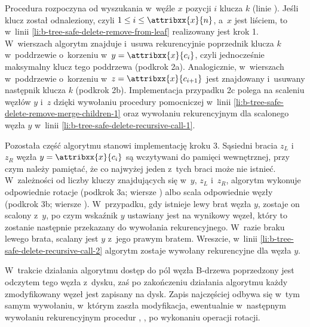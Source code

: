 Procedura rozpoczyna od wyszukania w~węźle $x$ pozycji $i$ klucza $k$ (linie \doubledash{\ref{li:b-tree-safe-delete-search-begin}}{\ref{li:b-tree-safe-delete-search-end}}).
Jeśli klucz został odnaleziony, czyli $1\le i\le\attribxx{x}{n}$, a~$x$ jest liściem, to w~linii \ref{li:b-tree-safe-delete-remove-from-leaf} realizowany jest krok 1.
W~wierszach \doubledash{\ref{li:b-tree-safe-delete-remove-predecessor-begin}}{\ref{li:b-tree-safe-delete-remove-predecessor-end}} algorytm znajduje i~usuwa rekurencyjnie poprzednik klucza $k$ w~poddrzewie o~korzeniu w~$y=\attribxx{x}{c_i}$, czyli jednocześnie maksymalny klucz tego poddrzewa (podkrok 2a).
Analogicznie, w~wierszach \doubledash{\ref{li:b-tree-safe-delete-remove-successor-begin}}{\ref{li:b-tree-safe-delete-remove-successor-end}} w~poddrzewie o~korzeniu w~$z=\attribxx{x}{c_{i+1}}$ jest znajdowany i~usuwany następnik klucza $k$ (podkrok 2b).
Implementacja przypadku 2c polega na scaleniu węzłów $y$ i~$z$ dzięki wywołaniu procedury pomocniczej w~linii \ref{li:b-tree-safe-delete-remove-merge-children-1} oraz wywołaniu rekurencyjnym dla scalonego węzła $y$ w~linii \ref{li:b-tree-safe-delete-recursive-call-1}.

Pozostała część algorytmu stanowi implementację kroku 3.
Sąsiedni bracia $z_L$ i~$z_R$ węzła $y=\attribxx{x}{c_i}$ są wczytywani do pamięci wewnętrznej, przy czym należy pamiętać, że co najwyżej jeden z~tych braci może nie istnieć.
W~zależności od liczby kluczy znajdujących się w~$y$, $z_L$ i~$z_R$, algorytm wykonuje odpowiednie rotacje (podkrok 3a; wiersze \doubledash{\ref{li:b-tree-safe-delete-rotations-begin}}{\ref{li:b-tree-safe-delete-rotations-end}}) albo scala odpowiednie węzły (podkrok 3b; wiersze \doubledash{\ref{li:b-tree-safe-delete-remove-mergers-begin}}{\ref{li:b-tree-safe-delete-remove-mergers-end}}).
W~przypadku, gdy istnieje lewy brat węzła $y$, zostaje on scalony z~$y$, po czym wskaźnik $y$ ustawiany jest na wynikowy węzeł, który to zostanie następnie przekazany do wywołania rekurencyjnego.
W~razie braku lewego brata, scalany jest $y$ z~jego prawym bratem.
Wreszcie, w~linii \ref{li:b-tree-safe-delete-recursive-call-2} algorytm zostaje wywołany rekurencyjne dla węzła $y$.

W~trakcie działania algorytmu dostęp do pól węzła B-drzewa poprzedzony jest odczytem tego węzła z~dysku, zaś po zakończeniu działania algorytmu każdy zmodyfikowany węzeł jest zapisany na dysk.
Zapis najczęściej odbywa się w~tym samym wywołaniu, w~którym zaszła modyfikacja, ewentualnie w~następnym wywołaniu rekurencyjnym procedur , ,  po wykonaniu operacji rotacji.

